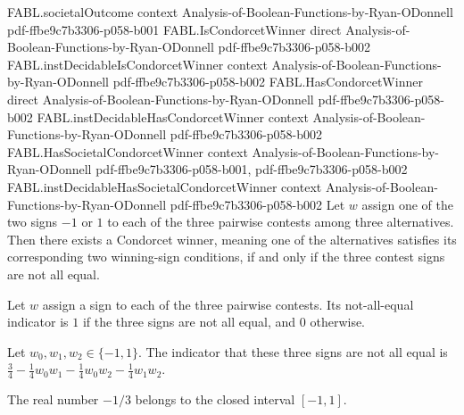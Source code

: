 \begin{theorem}
  {FABL.societalOutcome}
  {context}
  {Analysis-of-Boolean-Functions-by-Ryan-ODonnell}
  {pdf-ffbe9c7b3306-p058-b001}
\proofstep
  {FABL.IsCondorcetWinner}
  {direct}
  {Analysis-of-Boolean-Functions-by-Ryan-ODonnell}
  {pdf-ffbe9c7b3306-p058-b002}
\proofstep
  {FABL.instDecidableIsCondorcetWinner}
  {context}
  {Analysis-of-Boolean-Functions-by-Ryan-ODonnell}
  {pdf-ffbe9c7b3306-p058-b002}
\proofstep
  {FABL.HasCondorcetWinner}
  {direct}
  {Analysis-of-Boolean-Functions-by-Ryan-ODonnell}
  {pdf-ffbe9c7b3306-p058-b002}
\proofstep
  {FABL.instDecidableHasCondorcetWinner}
  {context}
  {Analysis-of-Boolean-Functions-by-Ryan-ODonnell}
  {pdf-ffbe9c7b3306-p058-b002}
\proofstep
  {FABL.HasSocietalCondorcetWinner}
  {context}
  {Analysis-of-Boolean-Functions-by-Ryan-ODonnell}
  {pdf-ffbe9c7b3306-p058-b001,
    pdf-ffbe9c7b3306-p058-b002}
\proofstep
  {FABL.instDecidableHasSocietalCondorcetWinner}
  {context}
  {Analysis-of-Boolean-Functions-by-Ryan-ODonnell}
  {pdf-ffbe9c7b3306-p058-b002}
Let $w$ assign one of the two signs $-1$ or $1$ to each of the three pairwise contests
among three alternatives. Then there exists a Condorcet winner, meaning one of the
alternatives satisfies its corresponding two winning-sign conditions, if and only if the
three contest signs are not all equal.
\end{theorem}

\begin{definition}
\label{FABL.nae3Indicator}
\leanok
{}
Let $w$ assign a sign to each of the three pairwise contests. Its not-all-equal
indicator is $1$ if the three signs are not all equal, and $0$ otherwise.
\end{definition}

\begin{theorem}
\label{FABL.nae3Indicator_eq_polynomial}
\leanok
{}
Let $w_0,w_1,w_2\in\{-1,1\}$. The indicator that these three signs are not all equal is
$\frac34-\frac14w_0w_1-\frac14w_0w_2-\frac14w_1w_2$.
\end{theorem}

\begin{theorem}
\label{FABL.neg_one_third_mem_Icc}
\leanok
{}
The real number $-1/3$ belongs to the closed interval $[-1,1]$.
\end{theorem}


